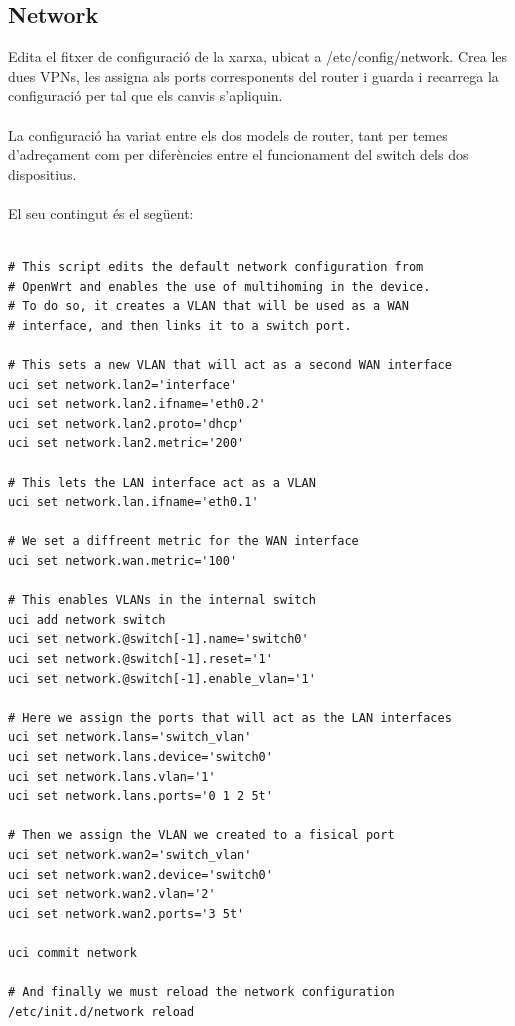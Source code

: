 \documentclass[11pt]{article}
\begin{document}
\subsection{Network}
Edita el fitxer de configuració de la xarxa, ubicat a /etc/config/network. Crea les dues VPNs, les assigna als ports corresponents del router i guarda i recarrega la configuració per tal que els canvis s’apliquin.\\
\\
La configuració ha variat entre els dos models de router, tant per temes d'adreçament com per diferències entre el funcionament del switch dels dos dispositius.\\
\\
El seu contingut és el següent:\\
\lstset{caption=Script de configuració de la xarxa: WNDR3800}
\begin{lstlisting}[frame=single]

# This script edits the default network configuration from 
# OpenWrt and enables the use of multihoming in the device.
# To do so, it creates a VLAN that will be used as a WAN 
# interface, and then links it to a switch port.

# This sets a new VLAN that will act as a second WAN interface
uci set network.lan2='interface'
uci set network.lan2.ifname='eth0.2'
uci set network.lan2.proto='dhcp'
uci set network.lan2.metric='200'

# This lets the LAN interface act as a VLAN
uci set network.lan.ifname='eth0.1'

# We set a diffreent metric for the WAN interface
uci set network.wan.metric='100'

# This enables VLANs in the internal switch
uci add network switch
uci set network.@switch[-1].name='switch0'
uci set network.@switch[-1].reset='1'
uci set network.@switch[-1].enable_vlan='1'

# Here we assign the ports that will act as the LAN interfaces
uci set network.lans='switch_vlan'
uci set network.lans.device='switch0'
uci set network.lans.vlan='1'
uci set network.lans.ports='0 1 2 5t'

# Then we assign the VLAN we created to a fisical port
uci set network.wan2='switch_vlan'
uci set network.wan2.device='switch0'
uci set network.wan2.vlan='2'
uci set network.wan2.ports='3 5t'

uci commit network

# And finally we must reload the network configuration
/etc/init.d/network reload
\end{lstlisting}
\end{document}
